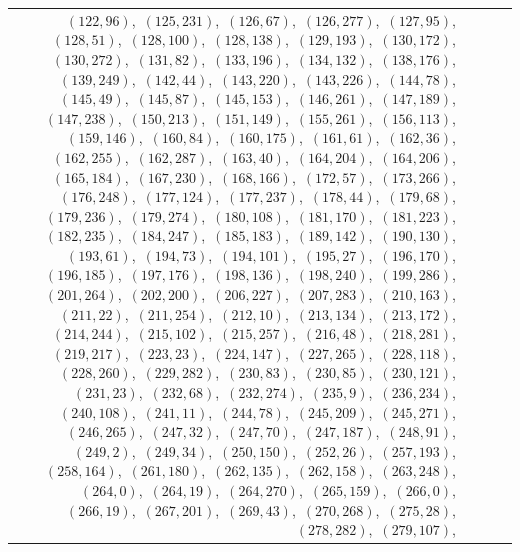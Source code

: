 \documentclass[11pt]{article}
\begin{document}
\begin{longtable}{@{}rrl>{\raggedright\arraybackslash}p{}@{}}
$(122,96)$,\allowbreak\ $(125,231)$,\allowbreak\ $(126,67)$,\allowbreak\ $(126,277)$,\allowbreak\ $(127,95)$,\allowbreak\ $(128,51)$,\allowbreak\ $(128,100)$,\allowbreak\ $(128,138)$,\allowbreak\ $(129,193)$,\allowbreak\ $(130,172)$,\allowbreak\ $(130,272)$,\allowbreak\ $(131,82)$,\allowbreak\ $(133,196)$,\allowbreak\ $(134,132)$,\allowbreak\ $(138,176)$,\allowbreak\ $(139,249)$,\allowbreak\ $(142,44)$,\allowbreak\ $(143,220)$,\allowbreak\ $(143,226)$,\allowbreak\ $(144,78)$,\allowbreak\ $(145,49)$,\allowbreak\ $(145,87)$,\allowbreak\ $(145,153)$,\allowbreak\ $(146,261)$,\allowbreak\ $(147,189)$,\allowbreak\ $(147,238)$,\allowbreak\ $(150,213)$,\allowbreak\ $(151,149)$,\allowbreak\ $(155,261)$,\allowbreak\ $(156,113)$,\allowbreak\ $(159,146)$,\allowbreak\ $(160,84)$,\allowbreak\ $(160,175)$,\allowbreak\ $(161,61)$,\allowbreak\ $(162,36)$,\allowbreak\ $(162,255)$,\allowbreak\ $(162,287)$,\allowbreak\ $(163,40)$,\allowbreak\ $(164,204)$,\allowbreak\ $(164,206)$,\allowbreak\ $(165,184)$,\allowbreak\ $(167,230)$,\allowbreak\ $(168,166)$,\allowbreak\ $(172,57)$,\allowbreak\ $(173,266)$,\allowbreak\ $(176,248)$,\allowbreak\ $(177,124)$,\allowbreak\ $(177,237)$,\allowbreak\ $(178,44)$,\allowbreak\ $(179,68)$,\allowbreak\ $(179,236)$,\allowbreak\ $(179,274)$,\allowbreak\ $(180,108)$,\allowbreak\ $(181,170)$,\allowbreak\ $(181,223)$,\allowbreak\ $(182,235)$,\allowbreak\ $(184,247)$,\allowbreak\ $(185,183)$,\allowbreak\ $(189,142)$,\allowbreak\ $(190,130)$,\allowbreak\ $(193,61)$,\allowbreak\ $(194,73)$,\allowbreak\ $(194,101)$,\allowbreak\ $(195,27)$,\allowbreak\ $(196,170)$,\allowbreak\ $(196,185)$,\allowbreak\ $(197,176)$,\allowbreak\ $(198,136)$,\allowbreak\ $(198,240)$,\allowbreak\ $(199,286)$,\allowbreak\ $(201,264)$,\allowbreak\ $(202,200)$,\allowbreak\ $(206,227)$,\allowbreak\ $(207,283)$,\allowbreak\ $(210,163)$,\allowbreak\ $(211,22)$,\allowbreak\ $(211,254)$,\allowbreak\ $(212,10)$,\allowbreak\ $(213,134)$,\allowbreak\ $(213,172)$,\allowbreak\ $(214,244)$,\allowbreak\ $(215,102)$,\allowbreak\ $(215,257)$,\allowbreak\ $(216,48)$,\allowbreak\ $(218,281)$,\allowbreak\ $(219,217)$,\allowbreak\ $(223,23)$,\allowbreak\ $(224,147)$,\allowbreak\ $(227,265)$,\allowbreak\ $(228,118)$,\allowbreak\ $(228,260)$,\allowbreak\ $(229,282)$,\allowbreak\ $(230,83)$,\allowbreak\ $(230,85)$,\allowbreak\ $(230,121)$,\allowbreak\ $(231,23)$,\allowbreak\ $(232,68)$,\allowbreak\ $(232,274)$,\allowbreak\ $(235,9)$,\allowbreak\ $(236,234)$,\allowbreak\ $(240,108)$,\allowbreak\ $(241,11)$,\allowbreak\ $(244,78)$,\allowbreak\ $(245,209)$,\allowbreak\ $(245,271)$,\allowbreak\ $(246,265)$,\allowbreak\ $(247,32)$,\allowbreak\ $(247,70)$,\allowbreak\ $(247,187)$,\allowbreak\ $(248,91)$,\allowbreak\ $(249,2)$,\allowbreak\ $(249,34)$,\allowbreak\ $(250,150)$,\allowbreak\ $(252,26)$,\allowbreak\ $(257,193)$,\allowbreak\ $(258,164)$,\allowbreak\ $(261,180)$,\allowbreak\ $(262,135)$,\allowbreak\ $(262,158)$,\allowbreak\ $(263,248)$,\allowbreak\ $(264,0)$,\allowbreak\ $(264,19)$,\allowbreak\ $(264,270)$,\allowbreak\ $(265,159)$,\allowbreak\ $(266,0)$,\allowbreak\ $(266,19)$,\allowbreak\ $(267,201)$,\allowbreak\ $(269,43)$,\allowbreak\ $(270,268)$,\allowbreak\ $(275,28)$,\allowbreak\ $(278,282)$,\allowbreak\ $(279,107)$,\allowbreak\ 
\end{longtable}
\end{document}
